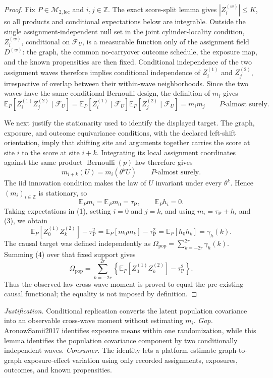 \documentclass{article}
\begin{document}
\begin{proof}
Fix \(P\in\mathcal M_{2,\mathrm{loc}}\) and \(i,j\in\mathbb Z\).  The exact score-split lemma gives \(|Z_i^{(w)}|\le K\), so all products and conditional expectations below are integrable.  Outside the single assignment-independent null set in the joint cylinder-locality condition, \(Z_i^{(w)}\), conditional on \(\mathcal F_U\), is a measurable function only of the assignment field \(D^{(w)}\): the graph, the common no-carryover outcome schedule, the exposure map, and the known propensities are then fixed.  Conditional independence of the two assignment waves therefore implies conditional independence of \(Z_i^{(1)}\) and \(Z_j^{(2)}\), irrespective of overlap between their within-wave neighborhoods.  Since the two waves have the same conditional Bernoulli design, the definition of \(m_i\) gives
\[
 \mathbb E_P[Z_i^{(1)}Z_j^{(2)}\mid\mathcal F_U]
 =\mathbb E_P[Z_i^{(1)}\mid\mathcal F_U]
  \mathbb E_P[Z_j^{(2)}\mid\mathcal F_U]
 =m_im_j
 \qquad P\text{-almost surely}. \tag{1}
\]

We next justify the stationarity used to identify the displayed target.  The graph, exposure, and outcome equivariance conditions, with the declared left-shift orientation, imply that shifting site and arguments together carries the score at site \(i\) to the score at site \(i+k\).  Integrating its local assignment coordinates against the same product \(\operatorname{Bernoulli}(p)\) law therefore gives
\[
 m_{i+k}(U)=m_i(\theta^kU)
 \qquad P\text{-almost surely}. \tag{2}
\]
The iid innovation condition makes the law of \(U\) invariant under every \(\theta^k\).  Hence \((m_i)_{i\in\mathbb Z}\) is stationary, so
\[
 \mathbb E_Pm_i=\mathbb E_Pm_0=\tau_{\mathrm P},
 \qquad
 \mathbb E_Ph_i=0. \tag{3}
\]
Taking expectations in (1), setting \(i=0\) and \(j=k\), and using \(m_i=\tau_{\mathrm P}+h_i\) and (3), we obtain
\[
 \mathbb E_P[Z_0^{(1)}Z_k^{(2)}]-\tau_{\mathrm P}^2
 =\mathbb E_P[m_0m_k]-\tau_{\mathrm P}^2
 =\mathbb E_P[h_0h_k]
 =\gamma_h(k). \tag{4}
\]
The causal target was defined independently as \(\Omega_{\mathrm{pop}}=\sum_{k=-2r}^{2r}\gamma_h(k)\).  Summing (4) over that fixed support gives
\[
 \Omega_{\mathrm{pop}}
 =\sum_{k=-2r}^{2r}
 \left\{\mathbb E_P[Z_0^{(1)}Z_k^{(2)}]-\tau_{\mathrm P}^2\right\}.
\]
Thus the observed-law cross-wave moment is proved to equal the pre-existing causal functional; the equality is not imposed by definition.
\end{proof}
\par\smallskip\noindent \textit{Justification.} Conditional replication converts the latent population covariance into an observable cross-wave moment without estimating \(m_i\). \textit{Gap.} AronowSamii2017 identifies exposure means within one randomization, while this lemma identifies the population covariance component by two conditionally independent waves. \textit{Consumer.} The identity lets a platform estimate graph-to-graph exposure-effect variation using only recorded assignments, exposures, outcomes, and known propensities.
\end{document}
